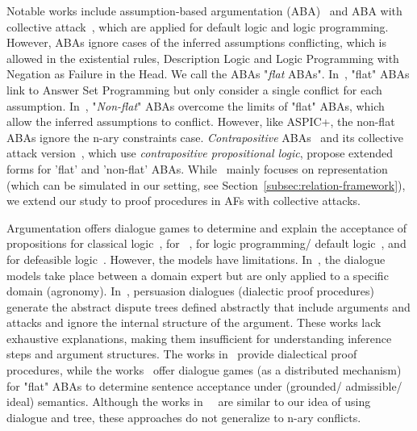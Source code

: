 \begin{itemize}
        Notable works include assumption-based argumentation (ABA)~\cite{Dung2009} and ABA with collective attack~\cite{DimopoulosD0R0W24}, which are applied for default logic and logic programming. However, ABAs ignore cases of the inferred assumptions conflicting, which is allowed in the existential rules, Description Logic and Logic Programming with Negation as Failure in the Head. We call the ABAs "\emph{flat} ABAs".       
        In~\cite{SCHULZ_TONI_2016}, "flat" ABAs link to Answer Set Programming but only consider a single conflict for each assumption. In~\cite{Rapberger2024,Lehtonen2024},
        "\emph{Non-flat}" ABAs overcome the limits of "flat" ABAs, which allow the inferred assumptions to conflict. However, like ASPIC+, the non-flat ABAs ignore the n-ary constraints case.
        \emph{Contrapositive} ABAs~\cite{HEYNINCK2020103} and its collective attack version~\cite{ArieliH24}, which use \emph{contrapositive propositional logic}, propose extended forms for  'flat' and 'non-flat' ABAs. While~\cite{ArieliH24} mainly focuses on representation (which can be simulated in our setting, see Section~\ref{subsec:relation-framework}), we extend our study to proof procedures in AFs with collective attacks.

\end{itemize}


Argumentation offers dialogue games to determine and explain the acceptance of propositions for classical logic~\cite{Castagna21}, for \datalogPM ~\cite{ARIOUA2017244,Arioua2014FE,Arioua2016,ARIOUA201776}, for logic programming/ default logic~\cite{ThangDH12,Xiuyi14}, and for defeasible logic~\cite{Prakken05}. However, the models have limitations.
In~\cite{ARIOUA2017244,Arioua2014FE}, the dialogue models take place between a domain expert but are only applied to a specific domain (agronomy). 
In~\cite{Arioua2016,ARIOUA201776,Prakken05,Castagna21}, persuasion dialogues (dialectic proof procedures) generate the abstract dispute trees defined abstractly that include arguments and attacks and ignore the internal structure of the argument. These works lack exhaustive explanations, making them insufficient for understanding inference steps and argument structures. The works in~\cite{DUNG2006114,DUNG2007642} provide dialectical proof procedures, while the works~\cite{Xiuyi14,ThangDH12} offer dialogue games (as a distributed mechanism) for "flat" ABAs to determine sentence acceptance under (grounded/ admissible/ ideal) semantics. Although the works in~~\cite{Xiuyi14,ThangDH12} are similar to our idea of using dialogue and tree, these approaches do not generalize to n-ary conflicts.



